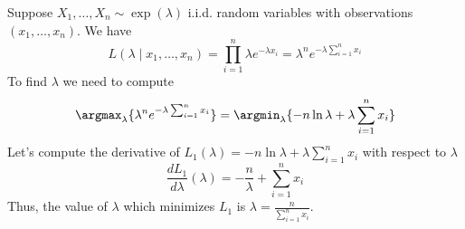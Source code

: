 \begin{example}
    Suppose $X_1, \hdots, X_n \sim \exp(\lambda)$ i.i.d. random variables with observations $(x_1, \hdots, x_n)$. We have
    $$ L(\lambda \mid x_1, \hdots, x_n) = \prod_{i=1}^{n}{\lambda e^{-\lambda x_i}} = \lambda^n e^{-\lambda\sum_{i=1}^{n}{x_i}} $$
    To find $\lambda$ we need to compute
    $$ \argmax_{\lambda}\{ \lambda^n e^{-\lambda\sum_{i=1}^{n}{x_i}} \} = \argmin_{\lambda}\{ -n\ln{\lambda} + \lambda\sum_{i=1}^{n}{x_i} \} $$
    Let's compute the derivative of $L_1(\lambda) = -n\ln{\lambda} + \lambda\sum_{i=1}^{n}{x_i}$ with respect to $\lambda$
    $$ \frac{dL_1}{d\lambda}(\lambda) = -\frac{n}{\lambda} + \sum_{i=1}^{n}{x_i} $$
    Thus, the value of $\lambda$ which minimizes $L_1$ is $\lambda = \frac{n}{\sum_{i=1}^{n}{x_i}}$.
\end{example}